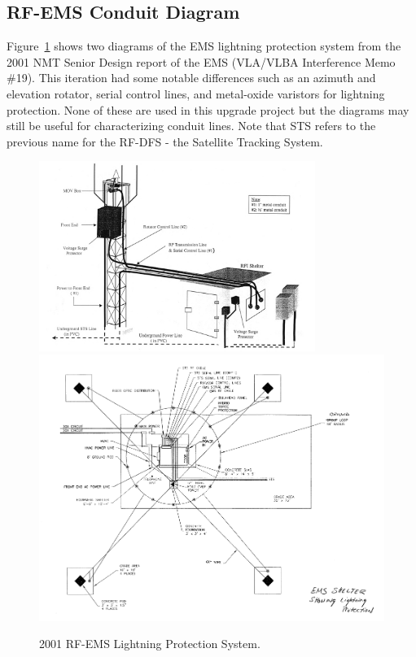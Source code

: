 \documentclass[titlepage]{article}
\begin{document}
\subsection{RF-EMS Conduit Diagram}
Figure~\ref{fig:oldems} shows two diagrams of the EMS lightning protection system from the 2001 NMT Senior Design report of the EMS (VLA/VLBA Interference Memo \#19). This iteration had some notable differences such as an azimuth and elevation rotator, serial control lines, and metal-oxide varistors for lightning protection. None of these are used in this upgrade project but the diagrams may still be useful for characterizing conduit lines. Note that STS refers to the previous name for the RF-DFS - the Satellite Tracking System.
\begin{figure}[!ht]
  \begin{center}
    \includegraphics[width=0.8\textwidth]{images/oldems.png}
    \includegraphics[width=\textwidth]{images/oldems2.png}
  \end{center}
  \caption{2001 RF-EMS Lightning Protection System.}\label{fig:oldems}
\end{figure}
\end{document}
